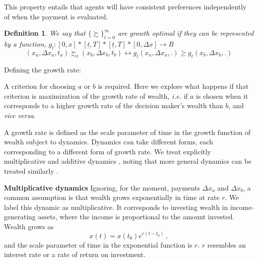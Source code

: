 \documentclass[11pt]{article}
\newtheorem{definition}{Definition}
\newcommand{\ie}{{\it i.e.}\xspace}
\newcommand{\be}{\begin{equation}}
\newcommand{\ee}{\end{equation}}
\newcommand{\Dx}{\Delta x}
\newcommand{\subhead}[1]{\mbox{}\newline\textbf{#1}\newline}
\numberwithin{equation}{section}
\begin{document}
This property entails that agents will have consistent preferences independently of when the payment is evaluated. 

\begin{definition}
We say that $\{ \succsim \}^{\infty}_{t=0}$ are growth optimal if they can be represented by a function, $g_t: [0,x] * [\underline{t}, T]*[\underline{t}, T]*[0, \Delta x] \rightarrow R$
\begin{equation}
(x_a,\Delta x_a, t_a) \succsim_t (x_b,\Delta x_b, t_b) \leftrightarrow g_t(x_a,\Delta x_a, .) \geq g_t(x_b,\Delta x_b, .)
\end{equation}
\end{definition}

Defining the growth rate:



A criterion for choosing $a$ or $b$ is required. Here we explore what happens if that criterion is maximization of the growth rate of wealth, \ie if $a$ is chosen when it corresponds to a higher growth rate of the decision maker's wealth than $b$, and \textit{vice versa}.

A growth rate is defined as the scale parameter of time in the growth function of wealth subject to dynamics. Dynamics can take different forms, each corresponding to a different form of growth rate. We treat explicitly multiplicative and additive dynamics \citep{PetersGell-Mann2016}, noting that more general dynamics can be treated similarly \citep{PetersAdamou2018a}.

\subhead{Multiplicative dynamics}
Ignoring, for the moment, payments $\Dx_a$ and $\Dx_b$, a common assumption is that wealth grows exponentially in time at rate $r$. We label this dynamic as multiplicative. It corresponds to investing wealth in income-generating assets, where the income is proportional to the amount invested. Wealth grows as
%
\be
x\left(t\right) = x\left(t_0\right) e^{r \left(t - t_0\right)}\,,
\ee
%
and the scale parameter of time in the exponential function is $r$. $r$ resembles an interest rate or a rate of return on investment.
\end{document}
